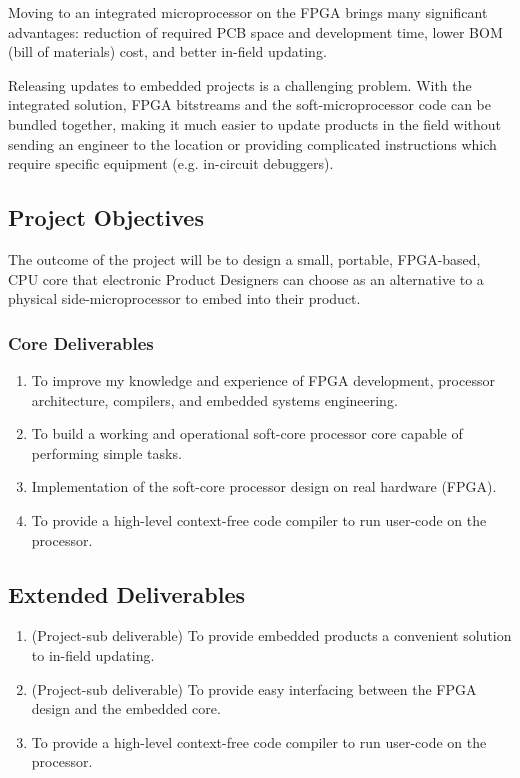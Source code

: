 Moving to an integrated microprocessor on the FPGA brings many significant advantages: reduction of required PCB space and development time, lower BOM (bill of materials) cost, and better in-field updating.

Releasing updates to embedded projects is a challenging problem. With the integrated solution, FPGA bitstreams and the soft-microprocessor code can be bundled together, making it much easier to update products in the field without sending an engineer to the location or providing complicated instructions which require specific equipment (e.g. in-circuit debuggers).

\newpage
\subsection*{Project Objectives}
The outcome of the project will be to design a small, portable, FPGA-based, CPU core that electronic Product Designers can choose as an alternative to a physical side-microprocessor to embed into their product.

\subsubsection*{Core Deliverables}
\begin{enumerate}[label=\bfseries P\arabic*.]
\item{To improve my knowledge and experience of FPGA development, processor architecture, compilers, and embedded systems engineering.}
\label{c1}
\item{To build a working and operational soft-core processor core capable of performing simple tasks.}
\item{Implementation of the soft-core processor design on real hardware (FPGA).}
\item{To provide a high-level context-free code compiler to run user-code on the processor.}
\end{enumerate}

\subsection*{Extended Deliverables}
\begin{enumerate}[label=\bfseries P\arabic*.]
\item{(Project-sub deliverable) To provide embedded products a convenient solution to in-field updating.}
\item{(Project-sub deliverable) To provide easy interfacing between the FPGA design and the embedded core.}  \item{To provide a high-level context-free code compiler to run user-code on the processor.}
\end{enumerate}

